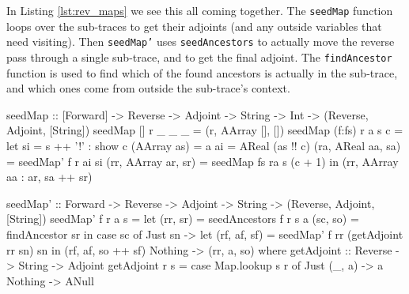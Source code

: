         In Listing \ref{lst:rev_maps} we see this all coming together.
        The \texttt{seedMap} function loops over the sub-traces to get their adjoints (and any outside variables that need visiting).
        Then \texttt{seedMap'} uses \texttt{seedAncestors} to actually move the reverse pass through a single sub-trace, and to get the final adjoint.
        The \texttt{findAncestor} function is used to find which of the found ancestors is actually in the sub-trace, and which ones come from outside the sub-trace's context.

        \begin{haskell}[caption={Functions for the reverse pass through maps. \texttt{seedMap} takes in the array of sub-traces used in the map, the current reverse map, the adjoint of the map's output array, the name of the map's output array, and an integer for keeping track of the index the function is currently on. It returns a 3-tuple containing the updated reverse map, the adjoint of the whole map operation, and a list of names of items that were affected by the map to add to the queue. \texttt{seedMap'} takes in a single sub-trace, the current reverse map, the adjoint of the map's output array, and the name of the map's output array. It also returns the a 3-tuple, with the updated array, the adjoint for this specific sub-trace, and a list of names of affected items in the trace.}, label=lst:rev_maps, gobble=12]
            seedMap :: [Forward] -> Reverse -> Adjoint -> String -> Int
                -> (Reverse, Adjoint, [String])
            seedMap []     r _ _ _ = (r, AArray [], [])
            seedMap (f:fs) r a s c =
                let si                  = s ++ '!' : show c
                    (AArray as)         = a
                    ai                  = AReal (as !! c)
                    (ra, AReal  aa, sa) = seedMap' f r ai si 
                    (rr, AArray ar, sr) = seedMap fs ra s (c + 1)
                in (rr, AArray aa : ar, sa ++ sr)

            seedMap' :: Forward -> Reverse -> Adjoint -> String
                -> (Reverse, Adjoint, [String])
            seedMap' f r a s =
                let (rr, sr) = seedAncestors f r s a
                    (sc, so) = findAncestor sr
                in  case sc of
                    Just sn -> 
                        let (rf, af, sf) = seedMap' f rr (getAdjoint rr sn) sn
                        in  (rf, af, so ++ sf)
                    Nothing -> (rr, a, so)
                where
                    getAdjoint :: Reverse -> String -> Adjoint
                    getAdjoint r s = case Map.lookup s r of
                        Just (_, a) -> a
                        Nothing     -> ANull
                    

\end{haskell}
